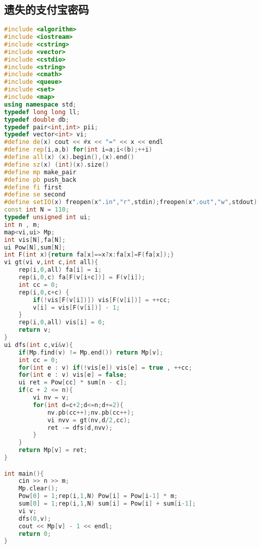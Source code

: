 \subsection{遗失的支付宝密码}
\begin{lstlisting}[language=C++]
#include <algorithm>
#include <iostream>
#include <cstring>
#include <vector>
#include <cstdio>
#include <string>
#include <cmath>
#include <queue>
#include <set>
#include <map>
using namespace std;
typedef long long ll;
typedef double db;
typedef pair<int,int> pii;
typedef vector<int> vi;
#define de(x) cout << #x << "=" << x << endl
#define rep(i,a,b) for(int i=a;i<(b);++i)
#define all(x) (x).begin(),(x).end()
#define sz(x) (int)(x).size()
#define mp make_pair
#define pb push_back
#define fi first
#define se second
#define setIO(x) freopen(x".in","r",stdin);freopen(x".out","w",stdout)
const int N = 110;
typedef unsigned int ui;
int n , m;
map<vi,ui> Mp;
int vis[N],fa[N];
ui Pow[N],sum[N];
int F(int x){return fa[x]==x?x:fa[x]=F(fa[x]);}
vi gt(vi v,int c,int all){
    rep(i,0,all) fa[i] = i;
    rep(i,0,c) fa[F(v[i+c])] = F(v[i]);
    int cc = 0;
    rep(i,0,c+c) {
        if(!vis[F(v[i])]) vis[F(v[i])] = ++cc;
        v[i] = vis[F(v[i])] - 1;
    }
    rep(i,0,all) vis[i] = 0;
    return v;
}
ui dfs(int c,vi&v){
    if(Mp.find(v) != Mp.end()) return Mp[v];
    int cc = 0;
    for(int e : v) if(!vis[e]) vis[e] = true , ++cc;
    for(int e : v) vis[e] = false;
    ui ret = Pow[cc] * sum[n - c];
    if(c + 2 <= n){
        vi nv = v;
        for(int d=c+2;d<=n;d+=2){
            nv.pb(cc++);nv.pb(cc++);
            vi nvv = gt(nv,d/2,cc);
            ret -= dfs(d,nvv);
        }
    }
    return Mp[v] = ret;
}

int main(){
    cin >> n >> m;
    Mp.clear();
    Pow[0] = 1;rep(i,1,N) Pow[i] = Pow[i-1] * m;
    sum[0] = 1;rep(i,1,N) sum[i] = Pow[i] + sum[i-1];
    vi v;
    dfs(0,v);
    cout << Mp[v] - 1 << endl;
    return 0;
}
\end{lstlisting}
